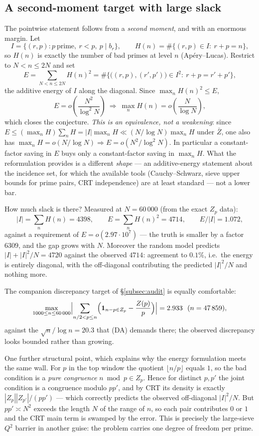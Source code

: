 \subsection{A second-moment target with large slack}
\label{subsec:energy}

The pointwise statement follows from a \emph{second moment}, and with an enormous margin.
Let
\[
  I=\{(r,p):p\ \text{prime},\ r<p,\ p\mid b_r\},\qquad
  H(n)=\#\{(r,p)\in I:\ r+p=n\},
\]
so $H(n)$ is exactly the number of bad primes at level $n$ (Ap\'ery--Lucas).  Restrict to
$N<n\le2N$ and set
\[
  E=\sum_{N<n\le2N}H(n)^2
  =\#\bigl\{\bigl((r,p),(r',p')\bigr)\in I^2:\ r+p=r'+p'\bigr\},
\]
the additive energy of $I$ along the diagonal.  Since $\max_nH(n)^2\le E$,
\[
  \boxed{\;E=o\!\left(\frac{N^2}{\log^2N}\right)\ \Longrightarrow\
  \max_nH(n)=o\!\left(\frac N{\log N}\right),\;}
\]
which closes the conjecture.  \emph{This is an equivalence, not a weakening}: since
$E\le(\max_nH)\sum_nH=|I|\max_nH\ll(N/\log N)\max_nH$ under $\bar Z$, one also has
$\max_nH=o(N/\log N)\Rightarrow E=o(N^2/\log^2N)$.  In particular a constant-factor saving in
$E$ buys only a constant-factor saving in $\max_nH$.  What the reformulation provides is a
different \emph{shape} — an additive-energy statement about the incidence set, for which the
available tools (Cauchy--Schwarz, sieve upper bounds for prime pairs, CRT independence) are at
least standard — not a lower bar.

How much slack is there?  Measured at $N=60\,000$ (from the exact $Z_p$ data):
\[
  |I|=\sum_nH(n)=4398,\qquad E=\sum_nH(n)^2=4714,\qquad E/|I|=1.072,
\]
against a requirement of $E=o(2.97\cdot10^7)$ — the truth is smaller by a factor $6309$, and
the gap grows with $N$.  Moreover the random model predicts $|I|+|I|^2/N=4720$ against the
observed $4714$: agreement to $0.1\%$, i.e.\ the energy is entirely diagonal, with the
off-diagonal contributing the predicted $|I|^2/N$ and nothing more.

The companion discrepancy target of \S\ref{subsec:audit} is equally comfortable:
\[
  \max_{1000\le n\le60\,000}\Bigl|\sum_{n/2<p\le n}
   \Bigl(\mathbf 1_{n-p\in Z_p}-\frac{Z(p)}p\Bigr)\Bigr| = 2.933\ \ (n=47\,859),
\]
against the $\sqrt n/\log n=20.3$ that (DA) demands there; the observed discrepancy looks
bounded rather than growing.

One further structural point, which explains why the energy formulation meets the same wall.
For $p$ in the top window the quotient $\lfloor n/p\rfloor$ equals $1$, so the bad condition
is a \emph{pure congruence} $n\bmod p\in Z_p$.  Hence for distinct $p,p'$ the joint condition
is a congruence modulo $pp'$, and by CRT its density is exactly
$|Z_p||Z_{p'}|/(pp')$ — which correctly predicts the observed off-diagonal $|I|^2/N$.  But
$pp'\asymp N^2$ exceeds the length $N$ of the range of $n$, so each pair contributes $0$ or
$1$ and the CRT main term is swamped by the error.  This is precisely the large-sieve $Q^2$
barrier in another guise: the problem carries one degree of freedom per prime.

